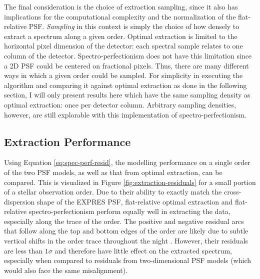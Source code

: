 The final consideration is the choice of extraction sampling, since it also has implications for the computational complexity and the normalization of the flat-relative PSF. \textit{Sampling} in this context is simply the choice of how densely to extract a spectrum along a given order. Optimal extraction is limited to the horizontal pixel dimension of the detector: each spectral sample relates to one column of the detector. Spectro-perfectionism does not have this limitation since a 2D PSF could be centered on fractional pixels. Thus, there are many different ways in which a given order could be sampled. For simplicity in executing the algorithm and comparing it against optimal extraction as done in the following section, I will only present results here which have the same sampling density as optimal extraction: once per detector column. Arbitrary sampling densities, however, are still explorable with this implementation of spectro-perfectionism.

\subsection{Extraction Performance} \label{pipeline2:spec-perf:performance}

Using Equation \ref{eq:spec-perf-resid}, the modelling performance on a single order of the two PSF models, as well as that from optimal extraction, can be compared. This is visualized in Figure \ref{fig:extraction-residuals} for a small portion of a stellar observation order. Due to their ability to exactly match the cross-dispersion shape of the EXPRES PSF, flat-relative optimal extraction and flat-relative spectro-perfectionism perform equally well in extracting the data, especially along the trace of the order. The positive and negative residual arcs that follow along the top and bottom edges of the order are likely due to subtle vertical shifts in the order trace throughout the night \citep[significantly less than one pixel per day,][]{blackman_performance_2020}. However, their residuals are less than $1\sigma$ and therefore have little effect on the extracted spectrum, especially when compared to residuals from two-dimensional PSF models (which would also face the same misalignment).

